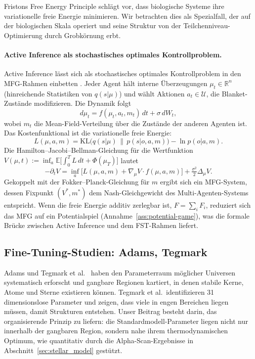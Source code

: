 \documentclass[12pt,a4paper]{article}
\theoremstyle{remark}
\begin{document}
Fristons Free Energy Principle \citep{Friston2010} schl\"agt vor, dass biologische Systeme ihre variationelle freie Energie minimieren. Wir betrachten dies als Spezialfall, der auf der biologischen Skala operiert und seine Struktur von der Teilchenniveau-Optimierung durch Grobk\"ornung erbt.

\paragraph{Active Inference als stochastisches optimales Kontrollproblem.}
Active Inference l\"asst sich als stochastisches optimales Kontrollproblem in den MFG-Rahmen einbetten \citep{LasryLions2006,LasryLions2007}. Jeder Agent h\"alt interne \"Uberzeugungen $\mu_t \in \mathbb{R}^n$ (hinreichende Statistiken von $q(s|\mu)$) und w\"ahlt Aktionen $a_t \in \mathcal{U}$, die Blanket-Zust\"ande modifizieren. Die Dynamik folgt
\[
  d\mu_t = f(\mu_t, a_t, m_t)\,dt + \sigma\,dW_t,
\]
wobei $m_t$ die Mean-Field-Verteilung \"uber die Zust\"ande der anderen Agenten ist. Das Kostenfunktional ist die variationelle freie Energie:
\[
  L(\mu, a, m) = \mathrm{KL}\bigl(q(s|\mu) \,\|\, p(s|o,a,m)\bigr) - \ln p(o|a,m).
\]
Die Hamilton--Jacobi--Bellman-Gleichung f\"ur die Wertfunktion $V(\mu,t) := \inf_{a} \mathbb{E}\bigl[\int_0^T L\,dt + \Phi(\mu_T)\bigr]$ lautet
\[
  -\partial_t V = \inf_a\bigl[L(\mu,a,m) + \nabla_\mu V \cdot f(\mu,a,m)\bigr] + \tfrac{\sigma^2}{2}\Delta_\mu V.
\]
Gekoppelt mit der Fokker--Planck-Gleichung f\"ur $m$ ergibt sich ein MFG-System, dessen Fixpunkt $(V^*, m^*)$ dem Nash-Gleichgewicht des Multi-Agenten-Systems entspricht. Wenn die freie Energie additiv zerlegbar ist, $F = \sum_i F_i$, reduziert sich das MFG auf ein Potentialspiel (Annahme~\ref{ass:potential-game}), was die formale Br\"ucke zwischen Active Inference und dem FST-Rahmen liefert.

\subsection{Fine-Tuning-Studien: Adams, Tegmark}

Adams \citep{Adams2019} und Tegmark et al.\ \citep{Tegmark2006} haben den Parameterraum m\"oglicher Universen systematisch erforscht und gangbare Regionen kartiert, in denen stabile Kerne, Atome und Sterne existieren k\"onnen. Tegmark et al.\ identifizieren 31 dimensionslose Parameter und zeigen, dass viele in engen Bereichen liegen m\"ussen, damit Strukturen entstehen. Unser Beitrag besteht darin, das organisierende Prinzip zu liefern: die Standardmodell-Parameter liegen nicht nur innerhalb der gangbaren Region, sondern nahe ihrem thermodynamischen Optimum, wie quantitativ durch die Alpha-Scan-Ergebnisse in Abschnitt~\ref{sec:stellar_model} gest\"utzt.
\end{document}
